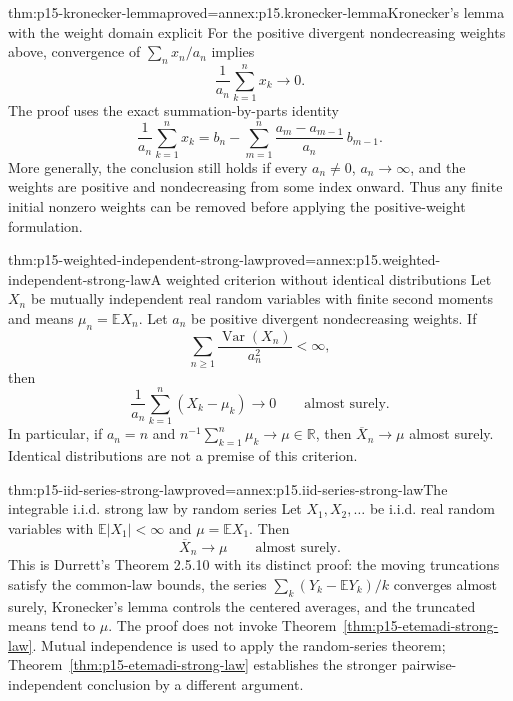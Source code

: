\begin{hbtheorem}{thm:p15-kronecker-lemma}{proved=annex:p15.kronecker-lemma}{Kronecker's lemma with the weight domain explicit}
For the positive divergent nondecreasing weights above, convergence of
\(\sum_nx_n/a_n\) implies
\[
 \frac1{a_n}\sum_{k=1}^nx_k\longrightarrow0.
\]
The proof uses the exact summation-by-parts identity
\[
 \frac1{a_n}\sum_{k=1}^nx_k
   =b_n-\sum_{m=1}^n\frac{a_m-a_{m-1}}{a_n}\,b_{m-1}.
\]
More generally, the conclusion still holds if every \(a_n\ne0\),
\(a_n\to\infty\), and the weights are positive and nondecreasing
from some index onward. Thus any finite initial nonzero weights can be
removed before applying the positive-weight formulation.
\end{hbtheorem}

\begin{hbcorollary}{thm:p15-weighted-independent-strong-law}{proved=annex:p15.weighted-independent-strong-law}{A weighted criterion without identical distributions}
Let \(X_n\) be mutually independent real random variables with finite
second moments and means \(\mu_n=\mathbb EX_n\). Let \(a_n\)
be positive divergent nondecreasing weights. If
\[
 \sum_{n\geq1}\frac{\operatorname{Var}(X_n)}{a_n^2}<\infty,
\]
then
\[
 \frac1{a_n}\sum_{k=1}^n(X_k-\mu_k)\longrightarrow0
                                      \qquad\text{almost surely}.
\]
In particular, if \(a_n=n\) and
\(n^{-1}\sum_{k=1}^n\mu_k\to\mu\in\mathbb R\), then
\(\overline X_n\to\mu\) almost surely. Identical distributions
are not a premise of this criterion.
\end{hbcorollary}

\begin{hbtheorem}{thm:p15-iid-series-strong-law}{proved=annex:p15.iid-series-strong-law}{The integrable i.i.d. strong law by random series}
Let \(X_1,X_2,\ldots\) be i.i.d. real random variables with
\(\mathbb E|X_1|<\infty\) and \(\mu=\mathbb EX_1\). Then
\[
 \overline X_n\longrightarrow\mu\qquad\text{almost surely}.
\]
This is Durrett's Theorem 2.5.10 with its distinct proof: the moving
truncations satisfy the common-law bounds, the series
\(\sum_k(Y_k-\mathbb EY_k)/k\) converges almost surely, Kronecker's
lemma controls the centered averages, and the truncated means tend to
\(\mu\). The proof does not invoke
Theorem~\ref{thm:p15-etemadi-strong-law}. Mutual independence is used
to apply the random-series theorem;
Theorem~\ref{thm:p15-etemadi-strong-law} establishes the stronger
pairwise-independent conclusion by a different argument.
\end{hbtheorem}


